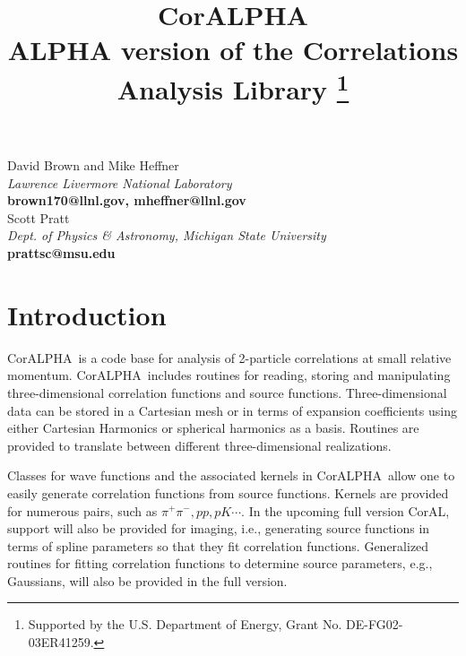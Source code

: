 \documentclass[10pt]{article}
\newcommand{\projectname}{CorALPHA}
\begin{document}
\title{\projectname\\
\Large \bf ALPHA version of the Correlations Analysis Library
\thanks{Supported by the U.S. Department of Energy, Grant No.  DE-FG02-03ER41259.}
}

\maketitle

\begin{center}
David Brown and Mike Heffner\\
{\it Lawrence Livermore National Laboratory}\\
{\small \bf brown170@llnl.gov, mheffner@llnl.gov}\\
\vspace*{8pt}
Scott Pratt\\
{\it Dept. of Physics \& Astronomy, Michigan State University}\\
{\small\bf prattsc@msu.edu}

\end{center}

\vspace*{0.4in}

\tableofcontents

\newpage

\section{Introduction}
\projectname\ is a code base for analysis of 2-particle correlations at small relative momentum. \projectname\ includes routines for reading, storing and manipulating three-dimensional correlation functions and source functions. Three-dimensional data can be stored in a Cartesian mesh or in terms of expansion coefficients using either Cartesian Harmonics or spherical harmonics as a basis. Routines are provided to translate between different three-dimensional realizations.

Classes for wave functions and the associated kernels in \projectname\ allow one to easily generate correlation functions from source functions. Kernels are provided for numerous pairs, such as $\pi^+\pi^-,pp,pK\cdots$. In the upcoming full version CorAL, support will also be provided for imaging, i.e., generating source functions in terms of spline parameters so that they fit correlation functions. Generalized routines for fitting correlation functions to determine source parameters, e.g., Gaussians, will also be provided in the full version.
\end{document}
